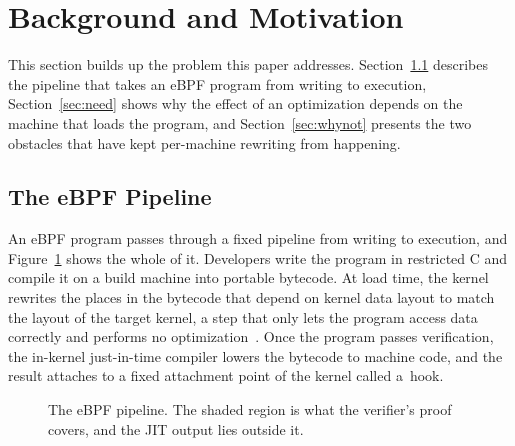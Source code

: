 \section{Background and Motivation}\label{sec:background}

This section builds up the problem this paper addresses.
Section~\ref{sec:pipeline} describes the pipeline that takes an eBPF program from writing to execution, Section~\ref{sec:need} shows why the effect of an optimization depends on the machine that loads the program, and Section~\ref{sec:whynot} presents the two obstacles that have kept per-machine rewriting from happening.

\subsection{The eBPF Pipeline}\label{sec:pipeline}

An eBPF program passes through a fixed pipeline from writing to execution, and Figure~\ref{fig:pipeline} shows the whole of it.
Developers write the program in restricted C and compile it on a build machine into portable bytecode.
At load time, the kernel rewrites the places in the bytecode that depend on kernel data layout to match the layout of the target kernel, a step that only lets the program access data correctly and performs no optimization~\cite{llvm-bpf-reloc}.
Once the program passes verification, the in-kernel just-in-time compiler lowers the bytecode to machine code, and the result attaches to a fixed attachment point of the kernel called a~hook.

\begin{figure}[t]
\centering

\caption{The eBPF pipeline. The shaded region is what the verifier's proof covers, and the JIT output lies outside it.}
\label{fig:pipeline}
\end{figure}

